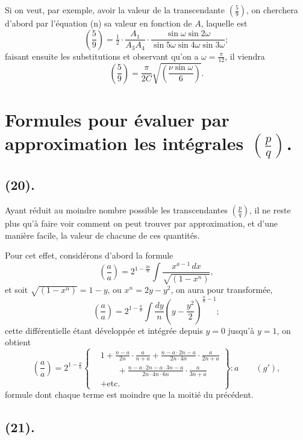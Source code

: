 \documentclass{article}
\begin{document}
Si on veut, par exemple, avoir la valeur de la transcendante $\left(\frac{5}{9}\right)$, on cherchera d'abord par l'équation (n) sa valeur en fonction de $A$, laquelle est
\[ \left(\frac{5}{9}\right)=\tfrac{1}{2}\cdot\frac{A_{1}}{A_{3}A_{4}}\cdot\frac{\sin\omega\sin 2\omega}{\sin 5\omega\sin 4\omega\sin 3\omega}; \]
faisant ensuite les substitutions et observant qu'on a $\omega=\frac{\pi}{12}$, il viendra
\[ \left(\frac{5}{9}\right)=\frac{\pi}{2C}\sqrt{\left(\frac{\nu\sin\omega}{6}\right)}. \]


\section*{Formules pour évaluer par approximation les intégrales $\left(\frac{p}{q}\right)$.}

\subsection*{(20).}

Ayant réduit au moindre nombre possible les transcendantes $\left(\frac{p}{q}\right)$, il ne reste plus qu'à faire voir comment on peut trouver par approximation, et d'une manière facile, la valeur de chacune de ces quantités.

Pour cet effet, considérons d'abord la formule
\[ \left(\frac{a}{a}\right)=2^{1-\frac{2a}{n}}\int\frac{x^{a-1}\,dx}{\sqrt{(1-x^{n})}}, \]
et soit $\sqrt{(1-x^{n})}=1-y$, ou $x^{n}=2y-y^{2}$, on aura pour transformée,
\[ \left(\frac{a}{a}\right)=2^{1-\frac{a}{n}}\int\frac{dy}{n}\left(y-\frac{y^{2}}{2}\right)^{\frac{a}{n}-1}; \]
cette différentielle étant développée et intégrée depuis $y=0$ jusqu'à $y=1$, on obtient
\[ \left(\frac{a}{a}\right)=2^{1-\frac{a}{n}}\left\{\begin{aligned} &1+\frac{n-a}{2n}\cdot\frac{a}{n+a}+\frac{n-a\cdot 2n-a}{2n\cdot 4n}\cdot\frac{a}{2n+a}\\ &\qquad+\frac{n-a\cdot 2n-a\cdot 3n-a}{2n\cdot 4n\cdot 6n}\cdot\frac{a}{3n+a}\\ &+\text{etc.} \end{aligned}\right\}:a\qquad(g'), \]
formule dont chaque terme est moindre que la moitié du précédent.

\subsection*{(21).}
\end{document}
